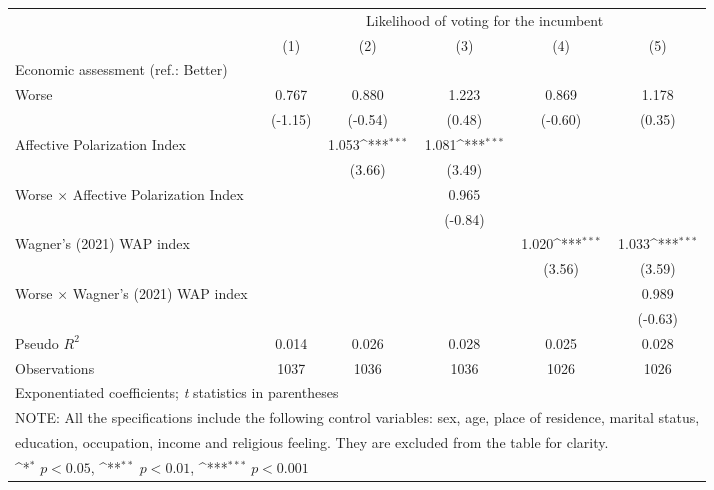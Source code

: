 {
\def\sym#1{\ifmmode^{#1}\else\(^{#1}\)\fi}
\begin{tabular}{l*{5}{c}}
\toprule
                &\multicolumn{5}{c}{Likelihood of voting for the incumbent}                                    \\\cmidrule(lr){2-6}
                &\multicolumn{1}{c}{(1)}         &\multicolumn{1}{c}{(2)}         &\multicolumn{1}{c}{(3)}         &\multicolumn{1}{c}{(4)}         &\multicolumn{1}{c}{(5)}         \\
\midrule
Economic assessment (ref.: Better)&                  &                  &                  &                  &                  \\
Worse           &    0.767         &    0.880         &    1.223         &    0.869         &    1.178         \\
                &  (-1.15)         &  (-0.54)         &   (0.48)         &  (-0.60)         &   (0.35)         \\
Affective Polarization Index&                  &    1.053\sym{***}&    1.081\sym{***}&                  &                  \\
                &                  &   (3.66)         &   (3.49)         &                  &                  \\
Worse $\times$ Affective Polarization Index&                  &                  &    0.965         &                  &                  \\
                &                  &                  &  (-0.84)         &                  &                  \\
Wagner's (2021) WAP index&                  &                  &                  &    1.020\sym{***}&    1.033\sym{***}\\
                &                  &                  &                  &   (3.56)         &   (3.59)         \\
Worse $\times$ Wagner's (2021) WAP index&                  &                  &                  &                  &    0.989         \\
                &                  &                  &                  &                  &  (-0.63)         \\
\midrule
Pseudo \(R^{2}\)&    0.014         &    0.026         &    0.028         &    0.025         &    0.028         \\
Observations    &     1037         &     1036         &     1036         &     1026         &     1026         \\
\bottomrule
\multicolumn{6}{l}{\footnotesize Exponentiated coefficients; \textit{t} statistics in parentheses}\\
\multicolumn{6}{l}{\footnotesize NOTE: All the specifications include the following control variables: sex, age, place of residence, marital status,}\\
\multicolumn{6}{l}{\footnotesize education, occupation, income and religious feeling. They are excluded from the table for clarity.}\\
\multicolumn{6}{l}{\footnotesize \sym{*} \(p<0.05\), \sym{**} \(p<0.01\), \sym{***} \(p<0.001\)}\\
\end{tabular}
}
